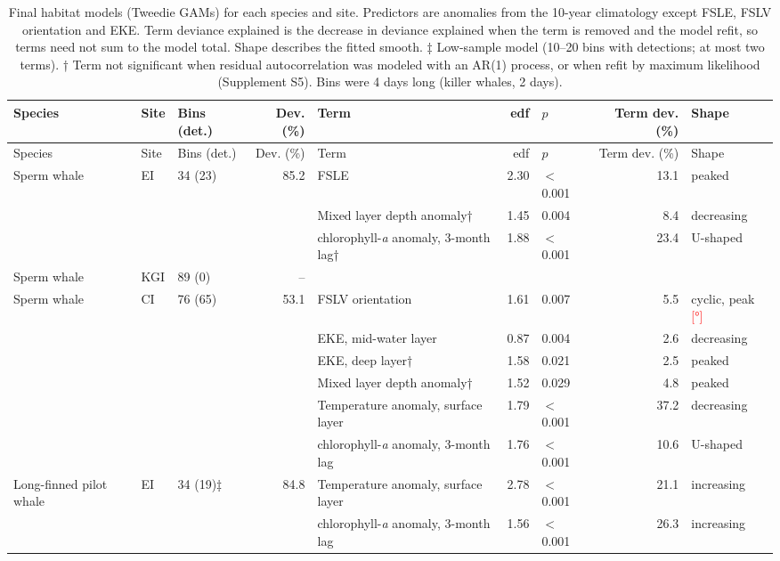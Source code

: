 \documentclass[11pt]{article}
\newcommand{\ins}[1]{\textcolor{red}{[#1]}}
\newcommand{\chla}{chlorophyll-\textit{a}}
\begin{document}
{\footnotesize
\setlength{\tabcolsep}{4pt}
\begin{longtable}{>{\raggedright}p{2.3cm}l>{\raggedright}p{1.4cm}r>{\raggedright}p{3.6cm}rlrl}
\caption{Final habitat models (Tweedie GAMs) for each species and site. Predictors are anomalies from the 10-year climatology except FSLE, FSLV orientation and EKE. Term deviance explained is the decrease in deviance explained when the term is removed and the model refit, so terms need not sum to the model total. Shape describes the fitted smooth. ‡ Low-sample model (10--20 bins with detections; at most two terms). † Term not significant when residual autocorrelation was modeled with an AR(1) process, or when refit by maximum likelihood (Supplement S5). Bins were 4 days long (killer whales, 2 days).}\label{tab:habitat}\\
\toprule
Species & Site & Bins (det.) & Dev. (\%) & Term & edf & $p$ & Term dev. (\%) & Shape \\
\midrule\endfirsthead
\toprule
Species & Site & Bins (det.) & Dev. (\%) & Term & edf & $p$ & Term dev. (\%) & Shape \\
\midrule\endhead
\bottomrule\endfoot
Sperm whale & EI & 34 (23) & 85.2 & FSLE & 2.30 & $<$0.001 & 13.1 & peaked \\
 & & & & Mixed layer depth anomaly† & 1.45 & 0.004 & 8.4 & decreasing \\
 & & & & \chla{} anomaly, 3-month lag† & 1.88 & $<$0.001 & 23.4 & U-shaped \\
Sperm whale & KGI & 89 (0) & -- & \multicolumn{5}{l}{not modeled ($<$10 bins with detections)} \\
Sperm whale & CI & 76 (65) & 53.1 & FSLV orientation & 1.61 & 0.007 & 5.5 & cyclic, peak \ins{°} \\
 & & & & EKE, mid-water layer & 0.87 & 0.004 & 2.6 & decreasing \\
 & & & & EKE, deep layer† & 1.58 & 0.021 & 2.5 & peaked \\
 & & & & Mixed layer depth anomaly† & 1.52 & 0.029 & 4.8 & peaked \\
 & & & & Temperature anomaly, surface layer & 1.79 & $<$0.001 & 37.2 & decreasing \\
 & & & & \chla{} anomaly, 3-month lag & 1.76 & $<$0.001 & 10.6 & U-shaped \\
\midrule
Long-finned pilot whale & EI & 34 (19)‡ & 84.8 & Temperature anomaly, surface layer & 2.78 & $<$0.001 & 21.1 & increasing \\
 & & & & \chla{} anomaly, 3-month lag & 1.56 & $<$0.001 & 26.3 & increasing \\

\end{longtable}}
\end{document}

